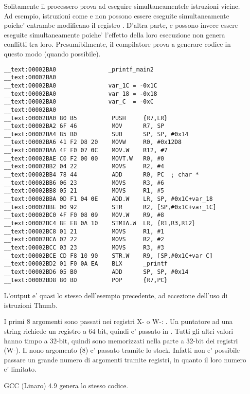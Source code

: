 Solitamente il processero prova ad eseguire simultaneamentele istruzioni vicine.
Ad esempio, istruzioni come  e
 non possono essere eseguite simultaneamente poiche' entrambe modificano il registro . 
D'altra parte,  e  
possono invece essere eseguite simultaneamente poiche' l'effetto della loro esecuzione non genera conflitti tra loro.
Presumibilmente, il compilatore prova a generare codice in questo modo (quando possibile).
 
\myparagraph{\OptimizingXcodeIV: \ThumbTwoMode}

\begin{lstlisting}
__text:00002BA0               _printf_main2
__text:00002BA0
__text:00002BA0               var_1C = -0x1C
__text:00002BA0               var_18 = -0x18
__text:00002BA0               var_C  = -0xC
__text:00002BA0
__text:00002BA0 80 B5          PUSH     {R7,LR}
__text:00002BA2 6F 46          MOV      R7, SP
__text:00002BA4 85 B0          SUB      SP, SP, #0x14
__text:00002BA6 41 F2 D8 20    MOVW     R0, #0x12D8
__text:00002BAA 4F F0 07 0C    MOV.W    R12, #7
__text:00002BAE C0 F2 00 00    MOVT.W   R0, #0
__text:00002BB2 04 22          MOVS     R2, #4
__text:00002BB4 78 44          ADD      R0, PC  ; char *
__text:00002BB6 06 23          MOVS     R3, #6
__text:00002BB8 05 21          MOVS     R1, #5
__text:00002BBA 0D F1 04 0E    ADD.W    LR, SP, #0x1C+var_18
__text:00002BBE 00 92          STR      R2, [SP,#0x1C+var_1C]
__text:00002BC0 4F F0 08 09    MOV.W    R9, #8
__text:00002BC4 8E E8 0A 10    STMIA.W  LR, {R1,R3,R12}
__text:00002BC8 01 21          MOVS     R1, #1
__text:00002BCA 02 22          MOVS     R2, #2
__text:00002BCC 03 23          MOVS     R3, #3
__text:00002BCE CD F8 10 90    STR.W    R9, [SP,#0x1C+var_C]
__text:00002BD2 01 F0 0A EA    BLX      _printf
__text:00002BD6 05 B0          ADD      SP, SP, #0x14
__text:00002BD8 80 BD          POP      {R7,PC}
\end{lstlisting}

L'output e' quasi lo stesso dell'esempio precedente, ad eccezione dell'uso di istruzioni Thumb. 





I primi 8 argomenti sono passati nei registri X- o W-: \ARMPCS.
Un puntatore ad una string richiede un registro a 64-bit, quindi e' passato in .
Tutti gli altri valori hanno timpo \Tint a 32-bit, quindi sono memorizzati nella parte a 32-bit dei registri (W-).
Il nono argomento (8) e' passato tramite lo stack.
Infatti non e' possibile passare un grande numero di argomenti tramite registri, in quanto il loro numero e' limitato.

\Optimizing GCC (Linaro) 4.9 genera lo stesso codice.
